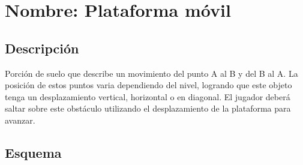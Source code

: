 \section{Nombre: Plataforma móvil}\label{obs.plataformaM}
	\subsection{Descripción}
Porción de suelo que describe un movimiento del punto A al B y del B al A. La posición de estos puntos varia dependiendo del nivel, logrando que este objeto tenga un desplazamiento vertical, horizontal o en diagonal. El jugador deberá saltar sobre este obstáculo utilizando el desplazamiento de la plataforma para avanzar.
	\subsection{Esquema}
	